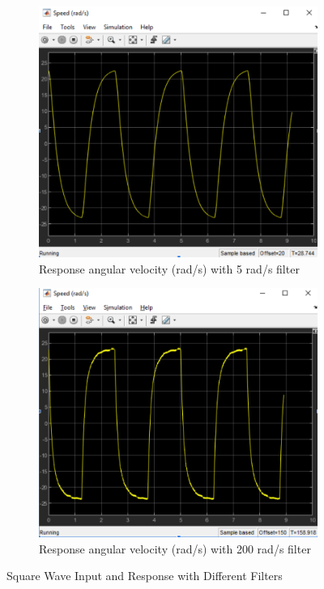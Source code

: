 \documentclass[letterpaper,12pt]{article}
\begin{document}
\begin{figure}[h]
    \centering
    \begin{subfigure}[t]{0.4\textwidth}
        \includegraphics[width=\textwidth]{Figures/square_wave_velocity_5_rad_s_filter.png}
        \caption{Response angular velocity (rad/s) with 5 rad/s filter}
        \label{fig:5_rad_s_filter}
    \end{subfigure}
    \begin{subfigure}[t]{0.4\textwidth}
        \includegraphics[width=\textwidth]{Figures/square_wave_velocity_200_rad_s_filter.png}
        \caption{Response angular velocity (rad/s) with 200 rad/s filter}
        \label{fig:200_rad_s_filter}
    \end{subfigure}
    \caption{Square Wave Input and Response with Different Filters}
\end{figure}
\phantom{a}
\end{document}

